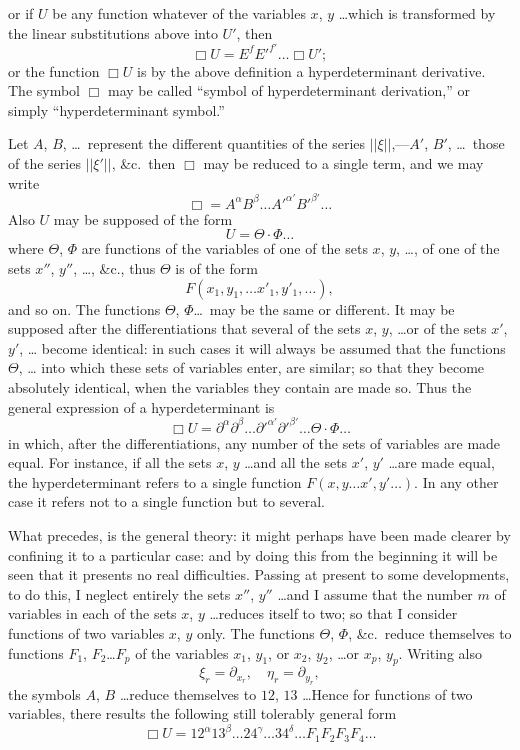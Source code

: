 \documentclass[11pt,a4paper]{article}
\theoremstyle{plain}
\theoremstyle{definition}
\theoremstyle{remark}
\begin{document}
\newpage
or if $U$ be any function whatever of the variables $x$, $y$ \ldots which is transformed by
the linear substitutions above into $U'$, then
\[
\Box U = E^f E'^{f'} \ldots \Box U';
\]
or the function $\Box U$ is by the above definition a hyperdeterminant derivative. The symbol $\Box$ may be called
``symbol of hyperdeterminant derivation,'' or simply ``hyperdeterminant symbol.''

Let $A$, $B$, \ldots\ represent the different quantities of the series $||\xi||$,---$A'$, $B'$, \ldots\ those of
the series $||\xi'||$, \&c.\ then $\Box$ may be reduced to a single term, and we may write
\[
\Box = A^{\alpha} B^{\beta} \ldots A'^{\alpha'} B'^{\beta'} \ldots
\]
Also $U$ may be supposed of the form
\[
U = \Theta \cdot \Phi \ldots
\]
where $\Theta$, $\Phi$ are functions of the variables of one of the sets $x$, $y$, \ldots, of one of the
sets $x''$, $y''$, \ldots, \&c., thus $\Theta$ is of the form
\[
F(x_1, y_1, \ldots x'_1, y'_1, \ldots),
\]
and so on. The functions $\Theta$, $\Phi$\ldots\ may be the same or different. It may be supposed
after the differentiations that several of the sets $x$, $y$, \ldots or of the sets $x'$, $y'$, \ldots
become identical: in such cases it will always be assumed that the functions $\Theta$, \ldots
into which these sets of variables enter, are similar; so that they become absolutely
identical, when the variables they contain are made so. Thus the general expression
of a hyperdeterminant is
\[
\Box U = \partial^{\alpha} \partial^{\beta} \ldots \partial'^{\alpha'} \partial'^{\beta'} \ldots \Theta \cdot \Phi \ldots
\]
in which, after the differentiations, any number of the sets of variables are made equal.
For instance, if all the sets $x$, $y$ \ldots and all the sets $x'$, $y'$ \ldots are made equal, the
hyperdeterminant refers to a single function $F(x, y \ldots x', y' \ldots)$. In any other case it
refers not to a single function but to several.

What precedes, is the general theory: it might perhaps have been made clearer
by confining it to a particular case: and by doing this from the beginning it will
be seen that it presents no real difficulties. Passing at present to some developments,
to do this, I neglect entirely the sets $x''$, $y''$ \ldots and I assume that the number $m$ of
variables in each of the sets $x$, $y$ \ldots reduces itself to two; so that I consider functions
of two variables $x$, $y$ only. The functions $\Theta$, $\Phi$, \&c.\ reduce themselves to functions
$F_1$, $F_2$\ldots $F_p$ of the variables $x_1$, $y_1$, or $x_2$, $y_2$, \ldots or $x_p$, $y_p$. Writing also
\[
\xi_r = \partial_{x_r}, \quad \eta_r = \partial_{y_r},
\]
the symbols $A$, $B$ \ldots reduce themselves to $12$, $13$ \ldots Hence for functions of two
variables, there results the following still tolerably general form
\[
\Box U = 12^{\alpha} 13^{\beta} \ldots 24^{\gamma} \ldots 34^{\delta} \ldots F_1 F_2 F_3 F_4 \ldots
\]
\end{document}

